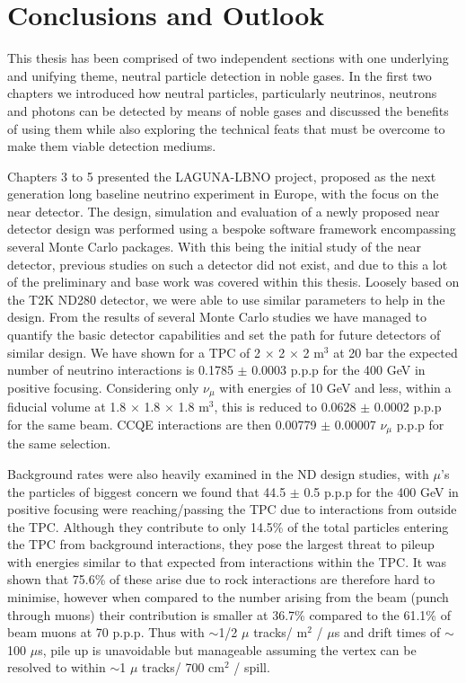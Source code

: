 \chapter{Conclusions and Outlook}
This thesis has been comprised of two independent sections with one underlying and unifying theme, neutral particle detection in noble gases. In the first two chapters we introduced how neutral particles, particularly neutrinos, neutrons and photons can be detected by means of noble gases and discussed the benefits of using them while also exploring the technical feats that must be overcome to make them viable detection mediums. 

Chapters 3 to 5 presented the LAGUNA-LBNO project, proposed as the next generation long baseline neutrino experiment in Europe, with the focus on the near detector. The design, simulation and evaluation of a newly proposed near detector design was performed using a bespoke  software framework encompassing several Monte Carlo packages. With this being the initial study of the near detector, previous studies on such a detector did not exist, and due to this a lot of the preliminary and base work was covered within this thesis. Loosely based on the T2K ND280 detector, we were able to use similar parameters to help in the design. From the results of several Monte Carlo studies we have managed to quantify the basic detector capabilities and set the path for future detectors of similar design. We have shown for a TPC of 2 $\times$ 2 $\times$ 2 m$^{3}$ at 20 bar the expected number of neutrino interactions is 0.1785 $\pm$ 0.0003 p.p.p for the 400 GeV in positive focusing. Considering only $\nu_{\mu}$ with energies of 10 GeV and less, within a fiducial volume at 1.8 $\times$ 1.8 $\times$ 1.8 m$^{3}$, this is reduced to 0.0628 $\pm$ 0.0002 p.p.p for the same beam. CCQE interactions are then 0.00779 $\pm$ 0.00007 $\nu_{\mu}$ p.p.p for the same selection.

Background rates were also heavily examined in the ND design studies, with $\mu$'s the particles of biggest concern we found that 44.5 $\pm$ 0.5 p.p.p for the 400 GeV in positive focusing were reaching/passing the TPC due to interactions from outside the TPC. Although they contribute to only 14.5\% of the total particles entering the TPC from background interactions, they pose the largest threat to pileup with energies similar to that expected from interactions within the TPC. It was shown that 75.6\% of these arise due to rock interactions are therefore hard to minimise, however when compared to the number arising from the beam (punch through muons) their contribution is smaller at 36.7\% compared to the 61.1\% of beam muons at 70 p.p.p. Thus with $\sim$1/2 $\mu$ tracks/ m$^{2}$ / $\mu$s and drift times of $\sim$100 $\mu$s, pile up is unavoidable but manageable assuming the vertex can be resolved to within $\sim$1 $\mu$ tracks/ 700 cm$^{2}$ / spill.

